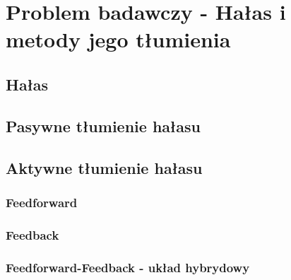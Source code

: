 \chapter{Problem badawczy - Hałas i metody jego tłumienia}
\label{cha:teoria}

\section{Hałas}
\label{sec:hałas}

\section{Pasywne tłumienie hałasu}
\label{sec:PNC}

\section{Aktywne tłumienie hałasu}
\label{sec:ANC}

\subsection{Feedforward}
\label{feedforward}

\subsection{Feedback}
\label{feedback}

\subsection{Feedforward-Feedback - układ hybrydowy}
\label{hybrid}

